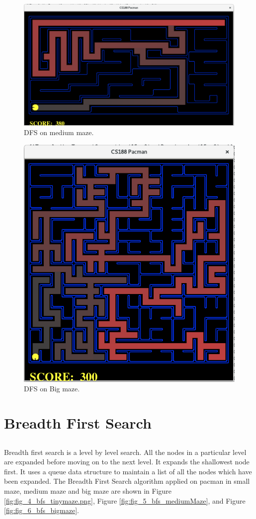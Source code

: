 \documentclass[
10pt, %
a4paper, %
oneside, %
headinclude,footinclude, %
BCOR5mm, %
]{scrartcl}
\begin{document}
\begin{figure}[h!]
	\centering
	\includegraphics[width=.5\textwidth]{images/fig_2_dfs_midmaze.png}
	\caption{ DFS on medium maze.}
	\label{fig:fig_2_dfs_midmaze}
\end{figure}


\begin{figure}[h!]
	\centering
	\includegraphics[width=.6\textwidth]{images/fig_3_dfs_bigmaze.png}
	\caption{ DFS on Big maze.}
	\label{fig:fig_3_dfs_bigmaze.png}
\end{figure}


\section{{\textbf{Breadth First Search}}}
\subsection*{}
Breadth first search is a level by level search. All the nodes in a particular level are expanded before moving on to the next level. It expands the shallowest node first. It uses a queue data structure to maintain a list of all the nodes which have been expanded. The Breadth First Search algorithm applied on pacman in small maze, medium maze and big maze are shown in Figure \ref{fig:fig_4_bfs_tinymaze.png}, Figure \ref{fig:fig_5_bfs_mediumMaze}, and Figure \ref{fig:fig_6_bfs_bigmaze}.
\end{document}

